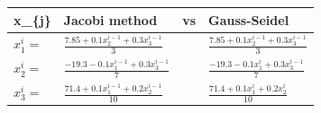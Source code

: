 \documentclass[11pt]{article}
\begin{document}
\begin{longtable}[c]{@{}llll@{}}
\toprule
\begin{minipage}[b]{0.10\columnwidth}\raggedright\strut
x\_\{j\}
\strut\end{minipage} &
\begin{minipage}[b]{0.36\columnwidth}\raggedright\strut
Jacobi method
\strut\end{minipage} &
\begin{minipage}[b]{0.05\columnwidth}\raggedright\strut
vs
\strut\end{minipage} &
\begin{minipage}[b]{0.37\columnwidth}\raggedright\strut
Gauss-Seidel
\strut\end{minipage}\tabularnewline
\midrule
\endhead
\begin{minipage}[t]{0.10\columnwidth}\raggedright\strut
$x_{1}^{i}=$
\strut\end{minipage} &
\begin{minipage}[t]{0.36\columnwidth}\raggedright\strut
$\frac{7.85+0.1x_{2}^{i-1}+0.3x_{3}^{i-1}}{3}$
\strut\end{minipage} &
\begin{minipage}[t]{0.05\columnwidth}\raggedright\strut
\strut\end{minipage} &
\begin{minipage}[t]{0.37\columnwidth}\raggedright\strut
$\frac{7.85+0.1x_{2}^{i-1}+0.3x_{3}^{i-1}}{3}$
\strut\end{minipage}\tabularnewline
\begin{minipage}[t]{0.10\columnwidth}\raggedright\strut
$x_{2}^{i}=$
\strut\end{minipage} &
\begin{minipage}[t]{0.36\columnwidth}\raggedright\strut
$\frac{-19.3-0.1x_{1}^{i-1}+0.3x_{3}^{i-1}}{7}$
\strut\end{minipage} &
\begin{minipage}[t]{0.05\columnwidth}\raggedright\strut
\strut\end{minipage} &
\begin{minipage}[t]{0.37\columnwidth}\raggedright\strut
$\frac{-19.3-0.1x_{1}^{i}+0.3x_{3}^{i-1}}{7}$
\strut\end{minipage}\tabularnewline
\begin{minipage}[t]{0.10\columnwidth}\raggedright\strut
$x_{3}^{i}=$
\strut\end{minipage} &
\begin{minipage}[t]{0.36\columnwidth}\raggedright\strut
$\frac{71.4+0.1x_{1}^{i-1}+0.2x_{2}^{i-1}}{10}$
\strut\end{minipage} &
\begin{minipage}[t]{0.05\columnwidth}\raggedright\strut
\strut\end{minipage} &
\begin{minipage}[t]{0.37\columnwidth}\raggedright\strut
$\frac{71.4+0.1x_{1}^{i}+0.2x_{2}^{i}}{10}$
\strut\end{minipage}\tabularnewline
\bottomrule
\end{longtable}
\end{document}
